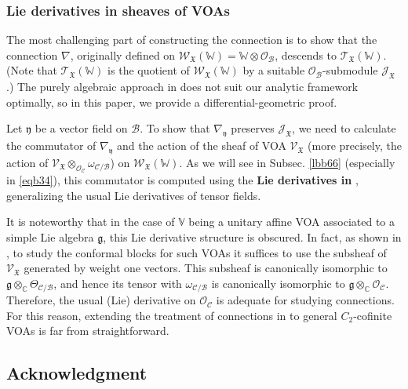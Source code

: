 \documentclass[11pt,b5paper,notitlepage]{article}
\theoremstyle{definition}
\theoremstyle{plain}
\newcommand{\scr}{\mathscr}
\newcommand{\gk}{\mathfrak g}
\newcommand{\yk}{\mathfrak y}
\newcommand{\Vbb}{\mathbb V}
\newcommand{\Wbb}{\mathbb W}
\newcommand{\Cbb}{\mathbb C}
\newcommand{\<}{\left\langle}
\renewcommand{\>}{\right\rangle}
\newcommand{\MO}{\mathcal{O}}
\newcommand{\MC}{\mathcal{C}}
\newcommand{\MB}{\mathcal{B}}
\newcommand{\fx}{\mathfrak{X}}
\newcommand{\SJ}{\mathscr{J}}
\numberwithin{equation}{section}
\begin{document}
\subsubsection*{Lie derivatives in sheaves of VOAs}


The most challenging part of constructing the connection  is to show that the connection $\nabla$, originally defined on $\scr W_\fx(\Wbb)=\Wbb\otimes\MO_\MB$, descends to $\scr T_\fx(\Wbb)$. (Note that $\scr T_\fx(\Wbb)$ is the quotient of $\scr W_\fx(\Wbb)$ by a suitable $\MO_\MB$-submodule $\SJ_\fx$.) The purely algebraic approach in \cite{FB04} does not suit our analytic framework optimally, so in this paper, we provide a differential-geometric proof.

Let $\yk$ be a vector field on $\MB$. To show that $\nabla_\yk$ preserves $\SJ_\fx$, we need to calculate the commutator of $\nabla_\yk$ and the action of the sheaf of VOA $\scr V_\fx$ (more precisely, the action of $\scr V_\fx\otimes_{\MO_\MC}\omega_{\MC/\MB}$) on $\scr W_\fx(\Wbb)$. As we will see in Subsec. \ref{lbb66} (especially in \eqref{eqb34}), this commutator is computed using the \textbf{Lie derivatives in \pmb{$\scr V_\fx\otimes\omega_{\MC/\MB}$}}, generalizing the usual Lie derivatives of tensor fields. 


It is noteworthy that in the case of $\Vbb$ being a unitary affine VOA associated to a simple Lie algebra $\gk$, this Lie derivative structure is obscured. In fact, as shown in \cite{TUY}, to study the conformal blocks for such VOAs it suffices to use the subsheaf of $\scr V_\fx$ generated by weight one vectors. This subsheaf is canonically isomorphic to $\gk\otimes_\Cbb\Theta_{\MC/\MB}$, and hence its tensor with $\omega_{\MC/\MB}$ is canonically isomorphic to $\gk\otimes_\Cbb\MO_\MC$. Therefore, the usual (Lie) derivative on $\MO_\MC$ is adequate for studying connections. For this reason, extending the treatment of connections in \cite{TUY} to general $C_2$-cofinite VOAs is far from straightforward.




\subsection*{Acknowledgment}
\end{document}
